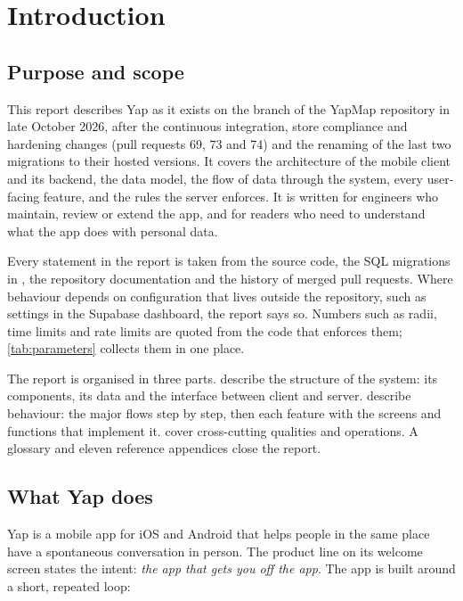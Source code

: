 \chapter{Introduction}
\label{ch:introduction}

\section{Purpose and scope}

This report describes Yap as it exists on the  branch of the YapMap repository in late
October 2026, after the continuous integration, store compliance and hardening changes (pull requests 69,
73 and 74) and the renaming of the last two migrations to their hosted versions. It covers the architecture of the mobile client and its backend, the data model, the
flow of data through the system, every user-facing feature, and the rules the server enforces. It is
written for engineers who maintain, review or extend the app, and for readers who need to understand
what the app does with personal data.

Every statement in the report is taken from the source code, the SQL migrations in
, the repository documentation and the history of merged pull requests. Where
behaviour depends on configuration that lives outside the repository, such as settings in the Supabase
dashboard, the report says so. Numbers such as radii, time limits and rate limits are quoted from the
code that enforces them; \cref{tab:parameters} collects them in one place.

The report is organised in three parts. 
describe the structure of the system: its components, its data and the interface between client and
server.  describe behaviour: the major flows step by step, then each feature
with the screens and functions that implement it. 
cover cross-cutting qualities and operations. A glossary and eleven reference appendices close the report.

\section{What Yap does}

Yap is a mobile app for iOS and Android that helps people in the same place have a spontaneous
conversation in person. The product line on its welcome screen states the intent: \emph{the app that gets
you off the app}. The app is built around a short, repeated loop:


